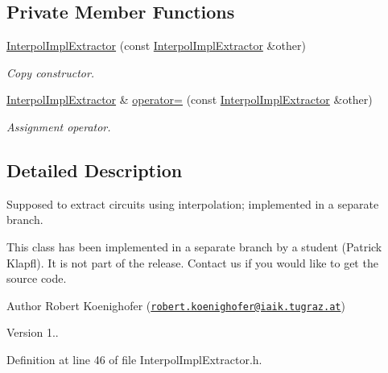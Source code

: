\subsection*{Private Member Functions}
\begin{DoxyCompactItemize}
\item 
\hyperlink{classInterpolImplExtractor_abb866f359748207053cc622db5da33ac}{Interpol\-Impl\-Extractor} (const \hyperlink{classInterpolImplExtractor}{Interpol\-Impl\-Extractor} \&other)
\begin{DoxyCompactList}\small\item\em Copy constructor. \end{DoxyCompactList}\item 
\hyperlink{classInterpolImplExtractor}{Interpol\-Impl\-Extractor} \& \hyperlink{classInterpolImplExtractor_af2fa16841a300e4868487eed0b556f8c}{operator=} (const \hyperlink{classInterpolImplExtractor}{Interpol\-Impl\-Extractor} \&other)
\begin{DoxyCompactList}\small\item\em Assignment operator. \end{DoxyCompactList}\end{DoxyCompactItemize}


\subsection{Detailed Description}
Supposed to extract circuits using interpolation; implemented in a separate branch. 

This class has been implemented in a separate branch by a student (Patrick Klapfl). It is not part of the release. Contact us if you would like to get the source code.

\begin{DoxyAuthor}{Author}
Robert Koenighofer (\href{mailto:robert.koenighofer@iaik.tugraz.at}{\tt robert.\-koenighofer@iaik.\-tugraz.\-at}) 
\end{DoxyAuthor}
\begin{DoxyVersion}{Version}
1.. 
\end{DoxyVersion}


Definition at line 46 of file Interpol\-Impl\-Extractor.\-h.



